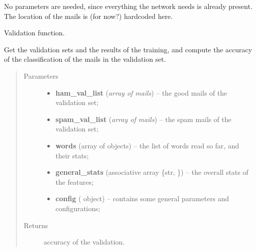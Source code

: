 \documentclass[letterpaper,10pt,english]{sphinxmanual}
\begin{document}
\begin{fulllineitems}
\begin{fulllineitems}
No parameters are needed, since everything the network needs is already
present. The location of the mails is (for now?) hardcoded here.

\end{fulllineitems}


\begin{fulllineitems}
\label{index:naive_bayes.Bayes.validate}
Validation function.

Get the validation sets and the results of the training, and
compute the accuracy of the classification of the mails
in the validation set.
\begin{quote}\begin{description}
\item[{Parameters}] \leavevmode\begin{itemize}
\item {} 
\textbf{ham\_val\_list} (\emph{array of mails}) -- the good mails of the validation set;

\item {} 
\textbf{spam\_val\_list} (\emph{array of mails}) -- the spam mails of the validation set;

\item {} 
\textbf{words} (array of {\hyperref[index:gen_stat.Word]{}} objects) -- the list of words read so far, and their stats;

\item {} 
\textbf{general\_stats} (associative array \{str, {\hyperref[index:gen_stat.Stat]{}}\}) -- the overall stats of the features;

\item {} 
\textbf{config} ({\hyperref[index:config.Config]{}} object) -- contains some general parameters and configurations;

\end{itemize}

\item[{Returns}] \leavevmode
accuracy of the validation.

\end{description}\end{quote}

\end{fulllineitems}


\end{fulllineitems}
\end{document}

